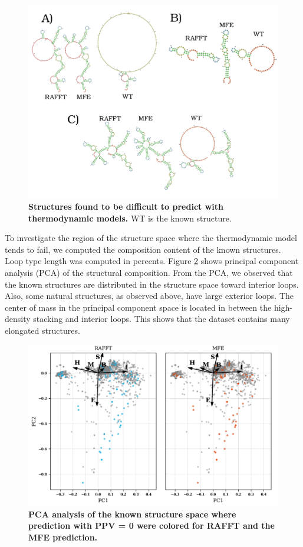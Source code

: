 \documentclass[a4paper,12pt]{article}
\begin{document}
{{\begin{figure}[htbp]
\centering
\includegraphics[scale=0.5]{img/comb_rna_struct.png}
\caption{\label{diff_struct}\textbf{Structures found to be difficult to predict with thermodynamic models.} WT is the known structure.}
\end{figure}

To investigate the region of the structure space where the thermodynamic model
tends to fail, we computed the composition content of the known structures. Loop
type length was computed in percents. Figure \ref{pca_fails} shows principal
component analysis (PCA) of the structural composition. From the PCA, we
observed that the known structures are distributed in the structure space toward
interior loops. Also, some natural structures, as observed above, have large
exterior loops. The center of mass in the principal component space is located
in between the high-density stacking and interior loops. This shows that the
dataset contains many elongated structures.

\begin{figure}[htbp]
\centering
\includegraphics[scale=0.6]{img/pca_known.png}
\caption{\label{pca_fails}\textbf{PCA analysis of the known structure space where prediction with PPV = 0 were colored for RAFFT and the MFE prediction.}}
\end{figure}

}}
\end{document}
